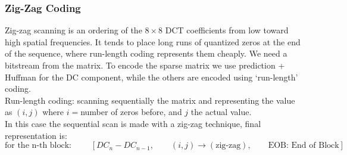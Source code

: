 \subsubsection{Zig-Zag Coding}
Zig-zag scanning is an ordering of the $8\times8$ DCT coefficients from low toward high spatial frequencies. It tends to place long runs of quantized zeros at the end of the sequence, where run-length coding represents them cheaply.
We need a bitstream from the matrix. To encode the sparse matrix we use prediction + Huffman for the DC component, while the others are encoded using `run-length' coding.\\
Run-length coding: scanning sequentially the matrix and representing the value as $(i,j)$ where $i = $number of zeros before, and $j$ the actual value.\\
In this case the sequential scan is made with a zig-zag technique, final representation is:
$$\text{for the n-th block: }\qquad \left[ DC_{n} - DC_{n-1},\qquad (i,j) \to (\text{zig-zag}),\qquad \text{EOB: End of Block}\right]$$
